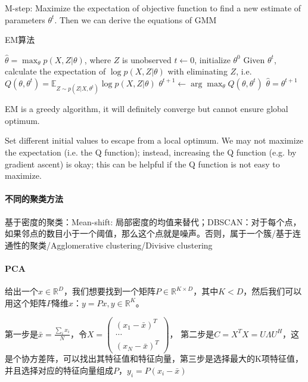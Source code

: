 M-step: Maximize the expectation of objective function to find a new estimate of parameters $\theta^t$. Then we can derive the equations of GMM

\begin{algorithm}[H]
\caption{EM算法}
\label{alg:EM}
\begin{algorithmic}[1]
\Require $\hat{\theta} = \max_\theta p(X,Z|\theta)$, where $Z$ is unobserved
\State $t \leftarrow 0$, initialize $\theta^0$
\Repeat
\State Given $\theta^t$, calculate the expectation of $\log p(X, Z|\theta)$ with eliminating $Z$, i.e. $Q(\theta, \theta^t) = \mathbb{E}_{Z\sim p(Z|X, \theta^t)}\log p(X, Z|\theta)$
\State $\theta^{t+1} \leftarrow \arg \max_{\theta} Q(\theta, \theta^t)$
\State $\hat{\theta} = \theta^{t+1}$
\end{algorithmic}
\end{algorithm}
EM is a greedy algorithm, it will definitely converge but cannot ensure global optimum.

Set different initial values to escape from a local optimum. We may not maximize the expectation (i.e. the Q function); instead, increasing the Q function (e.g. by gradient ascent) is okay; this can be helpful if the Q function is not easy to maximize.

\paragraph{不同的聚类方法}
基于密度的聚类：Mean-shift: 局部密度的均值来替代；DBSCAN：对于每个点，如果邻点的数目小于一个阈值，那么这个点就是噪声。否则，属于一个簇/基于连通性的聚类/Agglomerative clustering/Divisive clustering

\paragraph{PCA}
给出一个$x\in \mathbb{R}^D$，我们想要找到一个矩阵$P \in \mathbb{R}^{K \times D}$，其中$K < D$，然后我们可以用这个矩阵$P$降维$x$：$y = Px, y \in \mathbb{R}^K$。

第一步是$\bar{x} = \frac{\sum_i x_i}{N}$，令$X = \begin{pmatrix}
    (x_1 - \bar{x})^T \\
    \cdots \\
    (x_N - \bar{x})^T
\end{pmatrix}$，
第二步是$C = X^TX = U\Lambda U^H$，这是个协方差阵，可以找出其特征值和特征向量，第三步是选择最大的K项特征值，并且选择对应的特征向量组成$P$，$y_i = P(x_i - \bar{x})$

